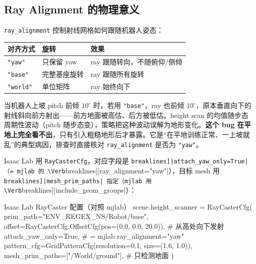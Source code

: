 \subsection{Ray Alignment 的物理意义}
\label{sec:rlmc-ql-terrain-align}

\verb|ray_alignment| 控制射线网格如何跟随机器人姿态：

\begin{center}
\small
\begin{tabular}{@{}lll@{}}
\toprule
对齐方式 & 旋转 & 效果 \\
\midrule
\verb|"yaw"| & 只保留 yaw & ray 跟随转向，不随俯仰/侧倾 \\
\verb|"base"| & 完整基座旋转 & ray 跟随所有旋转 \\
\verb|"world"| & 单位矩阵 & ray 始终向下 \\
\bottomrule
\end{tabular}
\end{center}

\begin{insight}\label{ins:rlmc-ql-align}
当机器人上坡 pitch 前倾 $10^\circ$ 时，若用 \verb|"base"|，ray 也前倾 $10^\circ$，原本垂直向下的射线斜向前方射出——前方地面被高估、后方被低估。height scan 的均值随步态周期性波动（pitch 随步态变），策略把这种波动误解为地形变化。\textbf{这个 bug 在平地上完全看不出}，只有引入粗糙地形后才暴露。它是“在平地训练正常、一上坡就乱”的典型病因，排查时直接核对 \verb|ray_alignment| 是否为 \verb|"yaw"|。
\end{insight}

Isaac Lab 用 \verb|RayCasterCfg|，对应字段是 \Verb[breaklines]|attach_yaw_only=True|（= mjlab 的 \Verb[breaklines]|ray_alignment="yaw"|），目标 mesh 用 \Verb[breaklines]|mesh_prim_paths| 指定（mjlab 用 \Verb[breaklines]|include_geom_groups|）：

\begin{codebox}[Python]{Isaac Lab RayCaster 配置（对照 mjlab）}
scene.height_scanner = RayCasterCfg(
    prim_path="{ENV_REGEX_NS}/Robot/base",
    offset=RayCasterCfg.OffsetCfg(pos=(0.0, 0.0, 20.0)),  # 从高处向下发射
    attach_yaw_only=True,                                  # = mjlab ray_alignment="yaw"
    pattern_cfg=GridPatternCfg(resolution=0.1, size=(1.6, 1.0)),
    mesh_prim_paths=["/World/ground"],                     # 只检测地面
)
\end{codebox}

